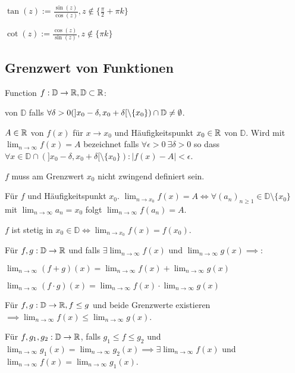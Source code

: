 \begin{compactdesc}
    \item[Tangens:] $\tan(z) := \frac{\sin(z)}{\cos(z)}, z \not\in \{\frac{\pi}{2} + \pi k\}$
    \item[Cotangens:] $\cot(z) := \frac{\cos(z)}{\sin(z)}, z \not\in \{\pi k\}$
\end{compactdesc}


\subsection{Grenzwert von Funktionen}
Function $f: \mathbb{D} \to \mathbb{R}, \mathbb{D} \subset \mathbb{R}$:
\begin{compactdesc}
    \item[Häufigkeitspunkt:] von $\mathbb{D}$ falls $\forall \delta > 0 (]x_0 - \delta, x_0 + \delta[ \setminus \{x_0\} ) \cap \mathbb{D} \neq \emptyset$.
    \item[Grenzwert:] $A \in \mathbb{R}$ von $f(x)$ für $x \to x_0$ und Häufigkeitspunkt $x_0 \in \mathbb{R}$ von $\mathbb{D}$. Wird mit $\lim_{n \to \infty} f(x) = A$ bezeichnet falls $\forall \epsilon > 0 \ \exists \delta > 0$ so dass $\forall x \in \mathbb{D} \cap (]x_0 - \delta, x_0 + \delta[ \setminus \{x_0\}) : |f(x) - A| < \epsilon$.
\end{compactdesc}
\begin{compactitem}
    \item $f$ muss am Grenzwert $x_0$ nicht zwingend definiert sein.
    \item Für $f$ und Häufigkeitspunkt $x_0$. $\lim_{n \to x_0}f(x) = A \iff \forall (a_n)_{n \ge 1} \in \mathbb{D} \setminus \{x_0\}$ mit $\lim_{n \to \infty} a_n = x_0$ folgt $\lim_{n \to \infty}f(a_n) = A$.
    \item $f$ ist stetig in $x_0 \in \mathbb{D} \iff \lim_{n \to x_0} f(x) = f(x_0)$.
    \item Für $f,g: \mathbb{D} \to \mathbb{R}$ und falls $\exists \lim_{n \to \infty} f(x)$ und $\lim_{n \to \infty} g(x) \implies$:
        \begin{inparaitem}
            \item $\lim_{n \to \infty} (f + g)(x) = \lim_{n \to \infty} f(x) + \lim_{n \to \infty} g(x)$
            \item $\lim_{n \to \infty} (f \cdot g)(x) = \lim_{n \to \infty} f(x) \cdot \lim_{n \to \infty} g(x)$
        \end{inparaitem}
    \item Für $f,g: \mathbb{D} \to \mathbb{R}, f \le g$ und beide Grenzwerte existieren $\implies \lim_{n \to \infty} f(x) \le \lim_{n \to \infty} g(x)$.
    \item Für $f,g_1, g_2: \mathbb{D} \to \mathbb{R}$, falls $g_1 \le f \le g_2$ und $\lim_{n \to \infty} g_1(x) = \lim_{n \to \infty} g_2(x) \implies \exists \lim_{n \to \infty} f(x)$ und $\lim_{n \to \infty} f(x) = \lim_{n \to \infty} g_1(x)$.
\end{compactitem}

